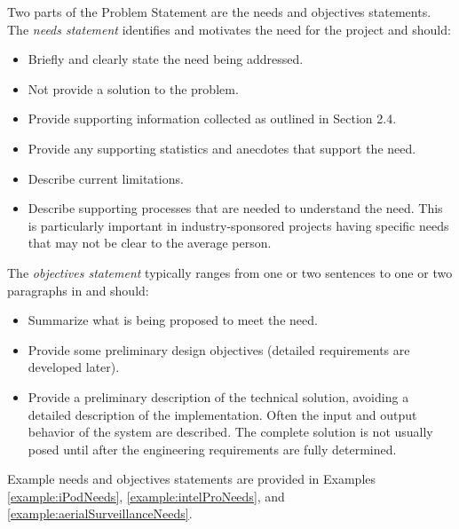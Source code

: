 Two parts of the Problem Statement are the needs and objectives
statements. The \emph{needs statement} identifies and motivates the need
for the project and should:

\begin{itemize}
\item
  Briefly and clearly state the need being addressed.
\item
  Not provide a solution to the problem.
\item
  Provide supporting information collected as outlined in Section 2.4.
\item
  Provide any supporting statistics and anecdotes that support the need.
\item
  Describe current limitations.
\item
  Describe supporting processes that are needed to understand the need.
  This is particularly important in industry-sponsored projects having
  specific needs that may not be clear to the average person.
\end{itemize}

The \emph{objectives statement} typically ranges from one or two
sentences to one or two paragraphs in and should:

\begin{itemize}
\item
  Summarize what is being proposed to meet the need.
\item
  Provide some preliminary design objectives (detailed requirements are
  developed later).
\item
  Provide a preliminary description of the technical solution, avoiding
  a detailed description of the implementation. Often the input and
  output behavior of the system are described. The complete solution is
  not usually posed until after the engineering requirements are fully
  determined.
\end{itemize}

Example needs and objectives statements are provided in Examples
\ref{example:iPodNeeds}, \ref{example:intelProNeeds}, and \ref{example:aerialSurveillanceNeeds}.

